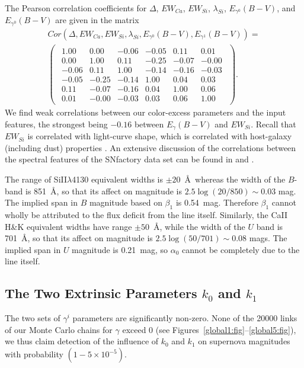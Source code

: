 \documentclass{aastex61}   	%
\begin{document}
The Pearson correlation coefficients for $\Delta$, $EW_{Ca}$, $EW_{Si}$, $\lambda_{Si}$, $E_{\gamma^0}(B-V)$, and $E_{\gamma^0}(B-V)$ are given in the matrix
\begin{multline}
Cor(\Delta, EW_{Ca}, EW_{Si}, \lambda_{Si}, E_{\gamma^0}(B-V), E_{\gamma^1}(B-V)) =\\
\begin{pmatrix}
\begin{array}{rrrrrr}
1.00 & 0.00 & -0.06 & -0.05 & 0.11 & 0.01 \\
0.00 & 1.00 & 0.11 & -0.25 & -0.07 & -0.00 \\
-0.06 & 0.11 & 1.00 & -0.14 & -0.16 & -0.03 \\
-0.05 & -0.25 & -0.14 & 1.00 & 0.04 & 0.03 \\
0.11 & -0.07 & -0.16 & 0.04 & 1.00 & 0.06 \\
0.01 & -0.00 & -0.03 & 0.03 & 0.06 & 1.00
\end{array}
\end{pmatrix}.
\end{multline}
\color{red}
We find weak correlations between our color-excess parameters and the input features, the strongest being $-0.16$ between
$E_\gamma(B-V)$ and $EW_{Si}$.
\color{black}
Recall that $EW_{Si}$ is correlated with light-curve shape, which is correlated with host-galaxy (including dust) properties 
\citep{2000AJ....120.1479H, 2003MNRAS.340.1057S}.
An extensive discussion of the correlations between the spectral features of the SNfactory data set can be found in \citet{chotard:thesis}
and \citet{leget:thesis}.

\color{red}
The range of SiII$\lambda$4130 equivalent widths is $\pm 20$~\AA\ whereas the width of the $B$-band is 851~\AA, so that its affect on magnitude
is
$2.5 \log{(20/850)} \sim 0.03$ mag.  
The implied span in $B$ magnitude based on $\beta_1$ is 0.54~mag.  Therefore $\beta_1$ cannot wholly be attributed to the flux deficit
from the line itself.
Similarly, the CaII H\&K equivalent widths have range $\pm 50$~\AA, while the width of the $U$ band is
701~\AA, so that its affect on magnitude
is
$2.5 \log{(50/701)} \sim 0.08$ mags.   The implied span in $U$ magnitude is  0.21~mag, so $\alpha_0$ cannot be completely due to the line itself.
\color{black}

\subsection{The Two Extrinsic Parameters $k_0$ and $k_1$}
\color{red}
The two sets of  $\gamma^i$ parameters  are significantly non-zero. 
\color{black}
None of the 20000 links of 
our Monte Carlo chains for $\gamma$ exceed 0 (see Figures~\ref{global1:fig}--\ref{global5:fig}), we thus claim detection of the
influence of $k_0$ and $k_1$  on supernova magnitudes
with probability $(1-5\times 10^{-5})$.
\end{document}
